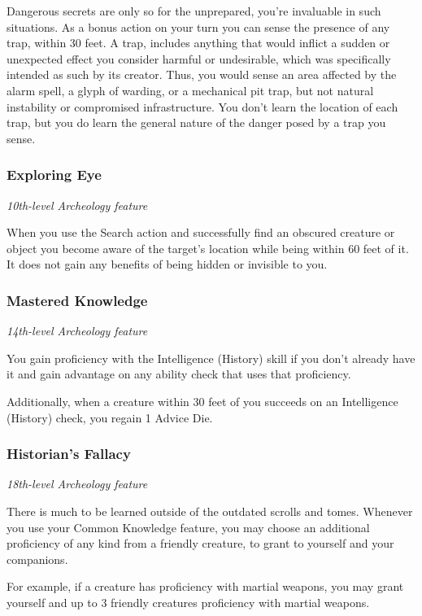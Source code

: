 \documentclass[letterpaper,openany,twoside,twocolumn]{book}
\begin{document}
	Dangerous secrets are only so for the unprepared, you're invaluable in such situations. As a bonus action on your turn you can sense the presence of any trap, within 30 feet. A trap, includes anything that would inflict a sudden or unexpected effect you consider harmful or undesirable, which was specifically intended as such by its creator. Thus, you would sense an area affected by the alarm spell, a glyph of warding, or a mechanical pit trap, but not natural instability or compromised infrastructure. You don't learn the location of each trap, but you do learn the general nature of the danger posed by a trap you sense.
	
	\subsubsection*{Exploring Eye}
	\textnormal{\textit{10th-level Archeology feature}}
	
	When you use the Search action and successfully find an obscured creature or object you become aware of the target's location while being within 60 feet of it. It does not gain any benefits of being hidden or invisible to you.
	
	\subsubsection*{Mastered Knowledge}
	\textnormal{\textit{14th-level Archeology feature}}
	
	You gain proficiency with the Intelligence (History) skill if you don't already have it and gain advantage on any ability check that uses that proficiency.
	
	Additionally, when a creature within 30 feet of you succeeds on an Intelligence (History) check, you regain 1 Advice Die.
	
	\subsubsection*{Historian's Fallacy}
	\textnormal{\textit{18th-level Archeology feature}}
	
	There is much to be learned outside of the outdated scrolls and tomes. Whenever you use your Common Knowledge feature, you may choose an additional proficiency of any kind from a friendly creature, to grant to yourself and your companions.
	
	For example, if a creature has proficiency with martial weapons, you may grant yourself and up to 3 friendly creatures proficiency with martial weapons.
	
\end{document}
